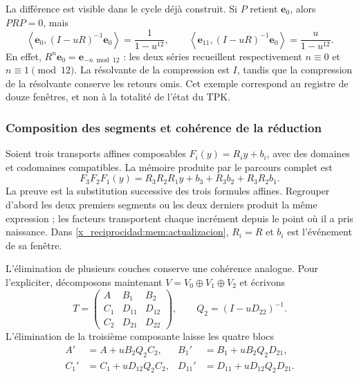 La différence est visible dans le cycle déjà construit. Si \(P\) retient
\(\mathbf e_0\), alors \(PRP=0\), mais
\begin{equation}
 \left\langle\mathbf e_0,(I-uR)^{-1}\mathbf e_0\right\rangle
 =\frac1{1-u^{12}},\qquad
 \left\langle\mathbf e_{11},(I-uR)^{-1}\mathbf e_0\right\rangle
 =\frac u{1-u^{12}}.
 \label{x_reciprocidad:mem:ejemplo-ciclo}
\end{equation}
En effet, \(R^n\mathbf e_0=\mathbf e_{-n\bmod12}\) : les
deux séries recueillent respectivement \(n\equiv0\) et
\(n\equiv1\pmod{12}\). La résolvante de la compression est \(I\),
tandis que la compression de la résolvante conserve les retours omis.
Cet exemple correspond au registre de douze fenêtres, et non à la totalité
de l'état du TPK.

\subsubsection{Composition des segments et cohérence de la réduction}

Soient trois transports affines composables
\(F_i(y)=R_i y+b_i\), avec des domaines et codomaines compatibles.
La mémoire produite par le parcours complet est
\begin{equation}
 F_3F_2F_1(y)
 =R_3R_2R_1y+b_3+R_3b_2+R_3R_2b_1.
 \label{x_reciprocidad:mem:cociclo-tres}
\end{equation}
La preuve est la substitution successive des trois formules affines.
Regrouper d'abord les deux premiers segments ou les deux derniers produit
la même expression ; les facteurs transportent chaque incrément depuis
le point où il a pris naissance. Dans \eqref{x_reciprocidad:mem:actualizacion},
\(R_i=R\) et \(b_i\) est l'événement de sa fenêtre.

L'élimination de plusieurs couches conserve une cohérence analogue.
Pour l'expliciter, décomposons maintenant
\(V=V_0\oplus V_1\oplus V_2\) et écrivons
\[
 T=\begin{pmatrix}
 A&B_1&B_2\\C_1&D_{11}&D_{12}\\C_2&D_{21}&D_{22}
 \end{pmatrix},\qquad Q_2=(I-uD_{22})^{-1}.
\]
L'élimination de la troisième composante laisse les quatre blocs
\begin{equation}
 \begin{aligned}
 A'&=A+uB_2Q_2C_2,&
 B_1'&=B_1+uB_2Q_2D_{21},\\
 C_1'&=C_1+uD_{12}Q_2C_2,&
 D_{11}'&=D_{11}+uD_{12}Q_2D_{21}.
 \end{aligned}
 \label{x_reciprocidad:mem:schur-intermedio}
\end{equation}

